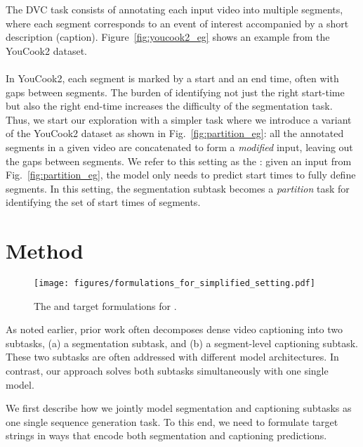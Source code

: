 \documentclass[11pt]{article}
\begin{document}
The DVC task consists of annotating each input video into multiple segments, where each segment corresponds to an event of interest accompanied by a short description (caption).  
Figure~\ref{fig:youcook2_eg} shows an example from the YouCook2 dataset.

\paragraph{\Partitiontask}
In YouCook2, each segment is marked by a start and an end time, often with gaps between segments. 
The burden of identifying not just the right start-time but also the right end-time increases the difficulty of the segmentation task. Thus, we start our exploration with a simpler task where we introduce a variant of the YouCook2 dataset as shown in Fig.~\ref{fig:partition_eg}: all the annotated segments in a given video are concatenated to form a {\em modified} input, leaving out the gaps between segments. 
We refer to this setting as the {\em \partitiontask}:
given an input from Fig.~\ref{fig:partition_eg}, the model only needs to predict  start times to fully define  segments.
In this setting, the segmentation subtask becomes a {\em partition} task for identifying the set of start times of segments.

 \section{Method}
\label{sec:model}

\begin{figure*}[htbp]
    \centering
    \vspace{-1ex}
    \texttt{[image: figures/formulations\_for\_simplified\_setting.pdf]}
    \caption{The \hardencoding and \offsetbased target formulations for \partitiontask.
    }
    \label{fig:formulations}
\vspace{-1ex}
\end{figure*}

As noted earlier, prior work often decomposes dense video captioning into two subtasks, (a) a segmentation subtask, and (b) a segment-level captioning subtask.
These two subtasks are often addressed with different model architectures.
In contrast, our approach solves both subtasks simultaneously with one single model.  

We first describe how we jointly model segmentation and captioning subtasks as one single sequence generation task.  To this end, we need to formulate target strings in ways that encode both segmentation and captioning predictions.
\end{document}
